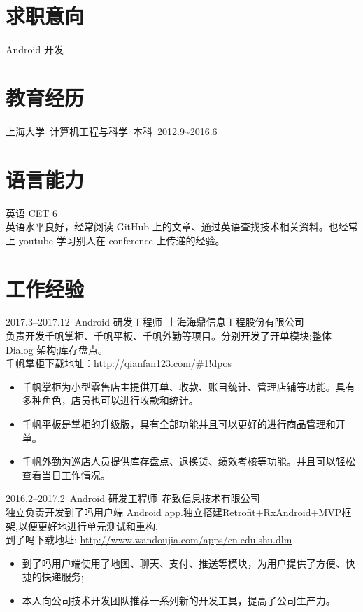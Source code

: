 \documentclass[11pt]{res}
\begin{document}
\address{  beatbox\_gao@hotmail.com\\ GitHub: \url{https://github.com/abcghy} \\ Blog: \url{http://abcghy.github.io}}
\address{上海闵行 \\  18818217393 17602152878}

\begin{resume}

\section{求职意向}
  Android 开发

\section{教育经历}
  上海大学\ 计算机工程与科学\ 本科\ 2012.9\~{}2016.6

\section{语言能力}
  英语 CET 6 \\英语水平良好，经常阅读 GitHub 上的文章、通过英语查找技术相关资料。也经常上 youtube 学习别人在 conference 上传递的经验。

\section{工作经验}
  2017.3--2017.12\ Android 研发工程师\ 上海海鼎信息工程股份有限公司\\负责开发千帆掌柜、千帆平板、千帆外勤等项目。分别开发了开单模块;整体 Dialog 架构;库存盘点。\\千帆掌柜下载地址：\url{http://qianfan123.com/#1!dpos}
  \begin{itemize}
    \item 千帆掌柜为小型零售店主提供开单、收款、账目统计、管理店铺等功能。具有多种角色，店员也可以进行收款和统计。
    \item 千帆平板是掌柜的升级版，具有全部功能并且可以更好的进行商品管理和开单。
    \item 千帆外勤为巡店人员提供库存盘点、退换货、绩效考核等功能。并且可以轻松查看当日工作情况。
  \end{itemize}
  2016.2--2017.2\ Android 研发工程师\ 花致信息技术有限公司\\独立负责开发到了吗用户端 Android app.独立搭建Retrofit+RxAndroid+MVP框架,以便更好地进行单元测试和重构.\\到了吗下载地址: \url{http://www.wandoujia.com/apps/cn.edu.shu.dlm}
  \begin{itemize}
    \item 到了吗用户端使用了地图、聊天、支付、推送等模块，为用户提供了方便、快捷的快递服务;
    \item 本人向公司技术开发团队推荐一系列新的开发工具，提高了公司生产力。
  \end{itemize}
\clearpage

\end{resume}
\end{document}
